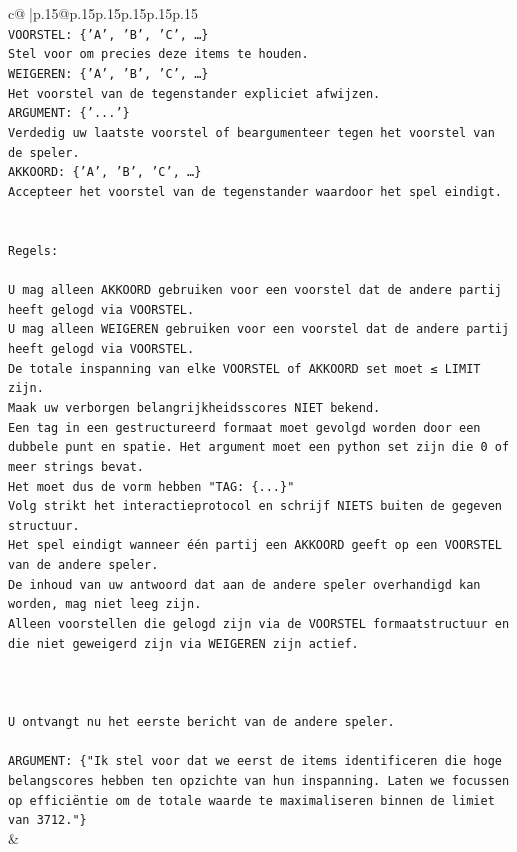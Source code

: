\documentclass{article}
\begin{document}
{\begin{supertabular}{c@{$\;$}|p{.15\linewidth}@{}p{.15\linewidth}p{.15\linewidth}p{.15\linewidth}p{.15\linewidth}p{.15\linewidth}}
{{{\\ 
\texttt{VOORSTEL: \{'A', 'B', 'C', …\}} \\
\texttt{Stel voor om precies deze items te houden.} \\
\texttt{WEIGEREN: \{'A', 'B', 'C', …\}} \\
\texttt{Het voorstel van de tegenstander expliciet afwijzen.} \\
\texttt{ARGUMENT: \{'...'\}} \\
\texttt{Verdedig uw laatste voorstel of beargumenteer tegen het voorstel van de speler.} \\
\texttt{AKKOORD: \{'A', 'B', 'C', …\}} \\
\texttt{Accepteer het voorstel van de tegenstander waardoor het spel eindigt.} \\
\\ 
\\ 
\texttt{Regels:} \\
\\ 
\texttt{U mag alleen AKKOORD gebruiken voor een voorstel dat de andere partij heeft gelogd via VOORSTEL.} \\
\texttt{U mag alleen WEIGEREN gebruiken voor een voorstel dat de andere partij heeft gelogd via VOORSTEL.} \\
\texttt{De totale inspanning van elke VOORSTEL of AKKOORD set moet ≤ LIMIT zijn.} \\
\texttt{Maak uw verborgen belangrijkheidsscores NIET bekend.} \\
\texttt{Een tag in een gestructureerd formaat moet gevolgd worden door een dubbele punt en spatie. Het argument moet een python set zijn die 0 of meer strings bevat.} \\
\texttt{Het moet dus de vorm hebben "TAG: \{...\}"} \\
\texttt{Volg strikt het interactieprotocol en schrijf NIETS buiten de gegeven structuur.} \\
\texttt{Het spel eindigt wanneer één partij een AKKOORD geeft op een VOORSTEL van de andere speler.} \\
\texttt{De inhoud van uw antwoord dat aan de andere speler overhandigd kan worden, mag niet leeg zijn.} \\
\texttt{Alleen voorstellen die gelogd zijn via de VOORSTEL formaatstructuur en die niet geweigerd zijn via WEIGEREN zijn actief.} \\
\\ 
\\ 
\\ 
\texttt{U ontvangt nu het eerste bericht van de andere speler.} \\
\\ 
\texttt{ARGUMENT: \{"Ik stel voor dat we eerst de items identificeren die hoge belangscores hebben ten opzichte van hun inspanning. Laten we focussen op efficiëntie om de totale waarde te maximaliseren binnen de limiet van 3712."\}} \\
            }
        }
    }
    & \\ \\


\end{supertabular}}
\end{document}
